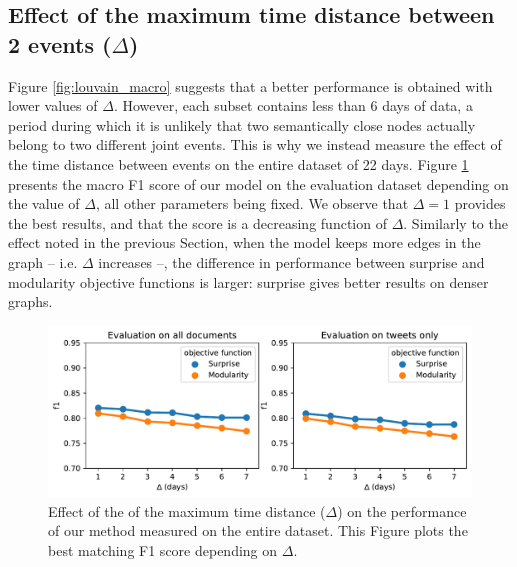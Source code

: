 \subsection{Effect of the maximum time distance between 2 events ($\Delta$)}

Figure \ref{fig:louvain_macro} suggests that a better performance is obtained with lower values of $\Delta$. However, each subset contains less than 6 days of data, a period during which it is unlikely that two semantically close nodes actually belong to two different joint events. This is why we instead measure the effect of the time distance between events on the entire dataset of 22 days. Figure \ref{fig:louvain_macro_days} presents the macro F1 score of our model on the evaluation dataset depending on the value of $\Delta$, all other parameters being fixed. We observe that $\Delta=1$ provides the best results, and that the score is a decreasing function of $\Delta$. Similarly to the effect noted in the previous Section, when the model keeps more edges in the graph -- i.e. $\Delta$ increases --, the difference in performance between surprise and modularity objective functions is larger: surprise gives better results on denser graphs.

\begin{figure}
    \centering
    \includegraphics[width=1\textwidth]{figures/louvain_macro_days_all_corpus.pdf}
    \caption[Effect of the of the maximum time distance on the performance of our method]{Effect of the of the maximum time distance ($\Delta$) on the performance of our method measured on the entire dataset. This Figure plots the best matching F1 score depending on $\Delta$.}
    \label{fig:louvain_macro_days}
\end{figure}
